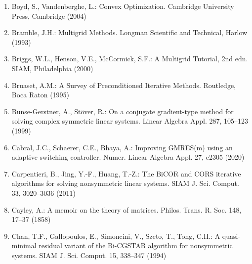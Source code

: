 \begin{enumerate}[label=\arabic*.,ref=\arabic*,leftmargin=3em]
\item\label{bib:source-26}Boyd, S., Vandenberghe, L.: Convex Optimization. Cambridge University Press, Cambridge (2004)

\item\label{bib:source-27}Bramble, J.H.: Multigrid Methods. Longman Scientific and Technical, Harlow (1993)

\item\label{bib:source-28}Briggs, W.L., Henson, V.E., McCormick, S.F.: A Multigrid Tutorial, 2nd edn. SIAM, Philadelphia (2000)

\item\label{bib:source-29}Bruaset, A.M.: A Survey of Preconditioned Iterative Methods. Routledge, Boca Raton (1995)

\item\label{bib:source-30}Bunse-Gerstner, A., Stöver, R.: On a conjugate gradient-type method for solving complex symmetric linear systems. Linear Algebra Appl. 287, 105–123 (1999)

\item\label{bib:source-31}Cabral, J.C., Schaerer, C.E., Bhaya, A.: Improving GMRES(m) using an adaptive switching controller. Numer. Linear Algebra Appl. 27, e2305 (2020)

\item\label{bib:source-32}Carpentieri, B., Jing, Y.-F., Huang, T.-Z.: The BiCOR and CORS iterative algorithms for solving nonsymmetric linear systems. SIAM J. Sci. Comput. 33, 3020–3036 (2011)

\item\label{bib:source-33}Cayley, A.: A memoir on the theory of matrices. Philos. Trans. R. Soc. 148, 17–37 (1858)

\item\label{bib:source-34}Chan, T.F., Gallopoulos, E., Simoncini, V., Szeto, T., Tong, C.H.: A quasi-minimal residual variant of the Bi-CGSTAB algorithm for nonsymmetric systems. SIAM J. Sci. Comput. 15, 338–347 (1994)


\end{enumerate}
